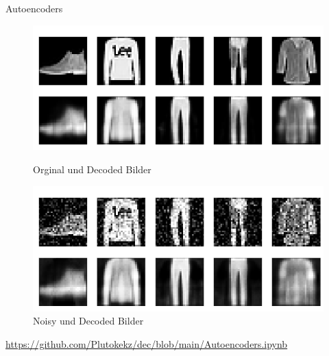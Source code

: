 \documentclass{beamer}
\begin{document}
\begin{frame}[t]{Autoencoders}\vspace{4pt}
\begin{figure}
\center
\includegraphics[scale=0.315]{AutoencoderResult.png}
{\fontsize{5}{6}\selectfont \caption{Orginal und Decoded Bilder}}
\includegraphics[scale=0.315]{DenosingAutoencoderResult.png}
{\fontsize{5}{6}\selectfont \caption{Noisy und Decoded Bilder}}
\end{figure}
\tiny{\url{https://github.com/Plutokekz/dec/blob/main/Autoencoders.ipynb}}
\end{frame}
\end{document}
